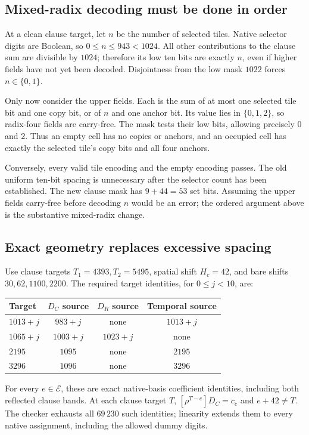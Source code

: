 \documentclass[11pt,a4paper]{article}
\theoremstyle{remark}\newtheorem{remark}[theorem]{Remark}
\begin{document}
\subsection{Mixed-radix decoding must be done in order}

At a clean clause target, let $n$ be the number of selected tiles.
Native selector digits are Boolean, so $0\le n\le943<1024$.
All other contributions to the clause sum are divisible by $1024$;
therefore its low ten bits are exactly $n$, even if higher fields have
not yet been decoded. Disjointness from the low mask $1022$ forces
$n\in\{0,1\}$.

Only now consider the upper fields. Each is the sum of at most one
selected tile bit and one copy bit, or of $n$ and one anchor bit.
Its value lies in $\{0,1,2\}$, so radix-four fields are carry-free.
The mask tests their low bits, allowing precisely $0$ and $2$.
Thus an empty cell has no copies or anchors, and an occupied cell has
exactly the selected tile's copy bits and all four anchors.

Conversely, every valid tile encoding and the empty encoding passes.
The old uniform ten-bit spacing is unnecessary after the selector count
has been established. The new clause mask has $9+44=53$ set bits.
Assuming the upper fields carry-free before decoding $n$ would be an
error; the ordered argument above is the substantive mixed-radix change.

\subsection{Exact geometry replaces excessive spacing}

Use clause targets $T_1=4393,T_2=5495$, spatial shift $H_c=42$,
and bare shifts $30,62,1100,2200$.
The required target identities, for $0\le j<10$, are:
\begin{center}\small
\begin{tabular}{@{}lccc@{}}
\toprule
Target & $D_C$ source & $D_R$ source & Temporal source\\
\midrule
$1013+j$ & $983+j$ & none & $1013+j$\\
$1065+j$ & $1003+j$ & $1023+j$ & none\\
$2195$ & $1095$ & none & $2195$\\
$3296$ & $1096$ & none & $3296$\\
\bottomrule
\end{tabular}
\end{center}
For every $e\in\mathcal E$, these are exact native-basis coefficient
identities, including both reflected clause bands. At each clause target
$T$, $[\rho^{T-e}]D_C=c_e$ and $e+42\ne T$.
The checker exhausts all $69\,230$ such identities; linearity extends
them to every native assignment, including the allowed dummy digits.
\end{document}

